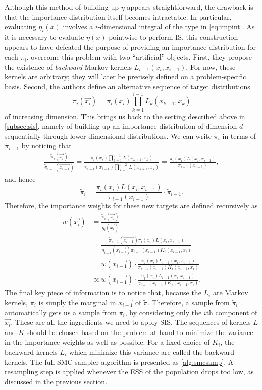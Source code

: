 Although this method of building up $\eta$ appears straightforward, the
drawback is that the importance distribution itself becomes intractable. In
particular, evaluating $\eta_i(x)$ involves a $i$-dimensional integral of the
type in \cref{eq:impint}. As it is necessary to evaluate $\eta(x)$ pointwise to
perform \gls{IS}, this construction appears to have defeated the purpose of
providing an importance distribution for each $\pi_i$.
\textcite{del2006sequential} overcome this problem with two ``artificial''
objects. First, they propose the existence of \textit{backward} Markov kernels
$L_{i-1}(x_i, x_{i-1})$. For now, these kernels are arbitrary; they will later
be precisely defined on a problem-specific basis. Second, the authors define an
alternative sequence of target distributions
\[
  \tilde{\pi}_i(\vec{x_i}) = \pi_i(x_i) \prod_{k=1}^{i-1} L_k(x_{k+1}, x_k)
\]
of increasing dimension. This brings us back to the setting described above in
\cref{subsec:sis}, namely of building up an importance distribution of
dimension $d$ sequentially through lower-dimensional distributions. We can
write $\tilde{\pi}_i$ in terms of $\tilde{\pi}_{i-1}$ by noticing that
\begin{align*}
  \frac{\tilde{\pi}_i(\vec{x_i})}{\tilde{\pi}_{i-1}(\vec{x_{i-1}})} 
  = \frac{\pi_i(x_i) \prod_{k=1}^{i-1} L(x_{k+1}, x_k)}
  {\pi_{i-1}(x_{i-1}) \prod_{k=1}^{i-2} L(x_{k+1}, x_k)}
  = \frac{\pi_i(x_i) L(x_i, x_{i-1})}{\pi_{i-1}(x_{i-1})},
\end{align*}
and hence
\[
  \tilde{\pi}_i = \frac{\pi_i(x_i) L(x_i, x_{i-1})}{\pi_{i-1}(x_{i-1})} \cdot \tilde{\pi}_{i-1}.
\]
Therefore, the importance weights for these new targets are defined recursively as
\begin{align}
  w(\vec{x_i}) 
    &= \frac{\tilde{\pi}_i(\vec{x_i})}{\eta_i(\vec{x_i})} \\
    &= \frac{\tilde{\pi}_{i-1}(\vec{x_{i-1}}) \pi_i(x_i) L(x_i, x_{i-1})}
           {\eta_{i-1}(\vec{x_{i-1}}) \pi_{i-1}(x_{i-1}) K_i(x_{i-1}, x_i)} \\
    &= w(\vec{x_{i-1}}) \cdot
      \frac{\pi_i(x_i) L_{i-1}(x_i, x_{i-1})}
           {\pi_{i-1}(x_{i-1}) K_i(x_{i-1}, x_i)} \\
    &\propto w(\vec{x_{i-1}}) \cdot
      \frac{\gamma_i(x_i) L_{i-1}(x_i, x_{i-1})}
           {\gamma_{i-1}(x_{i-1}) K_i(x_{i-1}, x_i)}.
    \label{eq:smcwt}
\end{align}
The final key piece of information is to notice that, because the $L_i$ are
Markov kernels, $\pi_i$ is simply the marginal in $\vec{x_{i-1}}$ of
$\tilde{\pi}$. Therefore, a sample from $\tilde{\pi}_i$ automatically gets us a
sample from $\pi_i$, by considering only the $i$th component of $\vec{x_i}$.
These are all the ingredients we need to apply \gls{SIS}. The sequences of
kernels $L$ and $K$ should be chosen based on the problem at hand to minimize
the variance in the importance weights as well as possible. For a fixed choice
of $K_i$, the backward kernels $L_i$ which minimize this variance are called
the  backward kernels. The full \gls{SMC} sampler algorithm is
presented as \cref{alg:smcsamp}. A resampling step is applied whenever the
\gls{ESS} of the population drops too low, as discussed in the previous
section.

